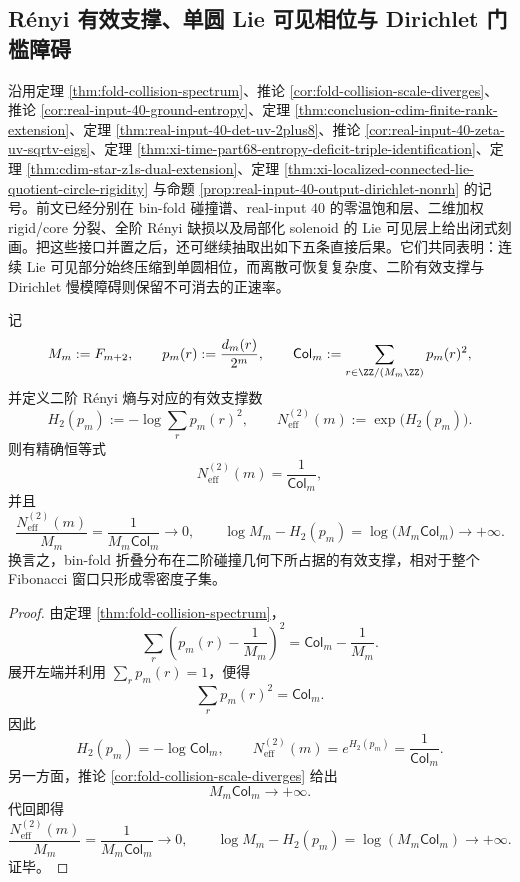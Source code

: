 \subsection{R\'enyi 有效支撑、单圆 Lie 可见相位与 Dirichlet 门槛障碍}\label{subsec:conclusion-renyi-effective-support-circlephase-dirichlet-obstruction}
沿用定理 \ref{thm:fold-collision-spectrum}、推论 \ref{cor:fold-collision-scale-diverges}、推论 \ref{cor:real-input-40-ground-entropy}、定理 \ref{thm:conclusion-cdim-finite-rank-extension}、定理 \ref{thm:real-input-40-det-uv-2plus8}、推论 \ref{cor:real-input-40-zeta-uv-sqrtv-eigs}、定理 \ref{thm:xi-time-part68-entropy-deficit-triple-identification}、定理 \ref{thm:cdim-star-z1s-dual-extension}、定理 \ref{thm:xi-localized-connected-lie-quotient-circle-rigidity} 与命题 \ref{prop:real-input-40-output-dirichlet-nonrh} 的记号。前文已经分别在 bin-fold 碰撞谱、real-input \(40\) 的零温饱和层、二维加权 rigid/core 分裂、全阶 R\'enyi 缺损以及局部化 solenoid 的 Lie 可见层上给出闭式刻画。把这些接口并置之后，还可继续抽取出如下五条直接后果。它们共同表明：连续 Lie 可见部分始终压缩到单圆相位，而离散可恢复复杂度、二阶有效支撑与 Dirichlet 慢模障碍则保留不可消去的正速率。

\begin{theorem}\label{thm:conclusion-renyi2-effective-support-zero-density-collapse}
记
\[
M_m:=F_{m+2},
\qquad
p_m(r):=\frac{d_m(r)}{2^m},
\qquad
\mathsf{Col}_m:=\sum_{r\in \ZZ/(M_m\ZZ)}p_m(r)^2,
\]
并定义二阶 R\'enyi 熵与对应的有效支撑数
\[
H_2(p_m):=-\log\sum_{r}p_m(r)^2,
\qquad
N_{\mathrm{eff}}^{(2)}(m):=\exp\!\bigl(H_2(p_m)\bigr).
\]
则有精确恒等式
\[
N_{\mathrm{eff}}^{(2)}(m)=\frac{1}{\mathsf{Col}_m},
\]
并且
\[
\frac{N_{\mathrm{eff}}^{(2)}(m)}{M_m}
=
\frac{1}{M_m\mathsf{Col}_m}
\longrightarrow 0,
\qquad
\log M_m-H_2(p_m)=\log\!\bigl(M_m\mathsf{Col}_m\bigr)\longrightarrow +\infty.
\]
换言之，bin-fold 折叠分布在二阶碰撞几何下所占据的有效支撑，相对于整个 Fibonacci 窗口只形成零密度子集。
\end{theorem}
\begin{proof}
由定理 \ref{thm:fold-collision-spectrum}，
\[
\sum_r\left(p_m(r)-\frac{1}{M_m}\right)^2
=
\mathsf{Col}_m-\frac{1}{M_m}.
\]
展开左端并利用 \(\sum_r p_m(r)=1\)，便得
\[
\sum_r p_m(r)^2=\mathsf{Col}_m.
\]
因此
\[
H_2(p_m)=-\log\mathsf{Col}_m,
\qquad
N_{\mathrm{eff}}^{(2)}(m)=e^{H_2(p_m)}=\frac{1}{\mathsf{Col}_m}.
\]
另一方面，推论 \ref{cor:fold-collision-scale-diverges} 给出
\[
M_m\mathsf{Col}_m\longrightarrow +\infty.
\]
代回即得
\[
\frac{N_{\mathrm{eff}}^{(2)}(m)}{M_m}
=
\frac{1}{M_m\mathsf{Col}_m}
\longrightarrow 0,
\qquad
\log M_m-H_2(p_m)=\log(M_m\mathsf{Col}_m)\longrightarrow +\infty.
\]
证毕。
\end{proof}


